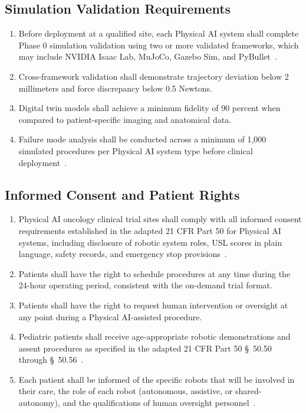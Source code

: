 \documentclass[11pt,letterpaper]{article}
\begin{document}
\subsection{Simulation Validation Requirements}

\begin{enumerate}[label=(\alph*)]
\item Before deployment at a qualified site, each Physical AI system shall
  complete Phase 0 simulation validation using two or more validated
  frameworks, which may include NVIDIA Isaac Lab, MuJoCo, Gazebo Sim, and
  PyBullet~\cite{iche6r3adapt}.

\item Cross-framework validation shall demonstrate trajectory deviation below
  2 millimeters and force discrepancy below 0.5 Newtons.

\item Digital twin models shall achieve a minimum fidelity of 90 percent when
  compared to patient-specific imaging and anatomical data.

\item Failure mode analysis shall be conducted across a minimum of 1,000
  simulated procedures per Physical AI system type before clinical
  deployment~\cite{cfr312adapt}.
\end{enumerate}

\subsection{Informed Consent and Patient Rights}

\begin{enumerate}[label=(\alph*)]
\item Physical AI oncology clinical trial sites shall comply with all informed
  consent requirements established in the adapted 21 CFR Part 50 for Physical
  AI systems, including disclosure of robotic system roles, USL scores in plain
  language, safety records, and emergency stop provisions~\cite{cfr50adapt}.

\item Patients shall have the right to schedule procedures at any time during
  the 24-hour operating period, consistent with the on-demand trial format.

\item Patients shall have the right to request human intervention or oversight
  at any point during a Physical AI-assisted procedure.

\item Pediatric patients shall receive age-appropriate robotic demonstrations
  and assent procedures as specified in the adapted 21 CFR Part 50
  \S~50.50 through \S~50.56~\cite{cfr50adapt}.

\item Each patient shall be informed of the specific robots that will be
  involved in their care, the role of each robot (autonomous, assistive, or
  shared-autonomy), and the qualifications of human oversight
  personnel~\cite{patientinstructions2026}.
\end{enumerate}
\end{document}
